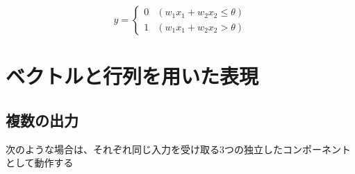 \documentclass[../../../topic_deep-learning]{subfiles}
\begin{document}
\begin{equation*}
  y = \begin{cases}
    0 & (w_1 x_1 + w_2 x_2 \leq \theta) \\
    1 & (w_1 x_1 + w_2 x_2 > \theta)
  \end{cases}
\end{equation*}

\sectionline
\section{ベクトルと行列を用いた表現}

\subsection{複数の出力}

次のような場合は、それぞれ同じ入力を受け取る3つの独立したコンポーネントとして動作する
\end{document}
